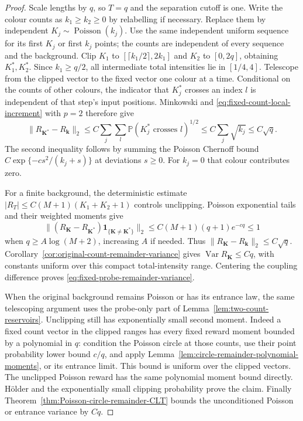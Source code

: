 \documentclass[11pt,letterpaper]{article}
\newcommand{\PP}{\mathbb P}\newcommand{\EE}{\mathbb E}
\newcommand{\ind}{\mathbf 1}\newcommand{\Exp}{\operatorname{Exp}}
\begin{document}
\begin{proof}
Scale lengths by $q$, so $T=q$ and the separation cutoff is
one. Write the colour counts as $k_1\ge k_2\ge0$ by
relabelling if necessary. Replace them by independent
$K_j\sim\operatorname{Poisson}(k_j)$. Use the same independent
uniform sequence for its first $K_j$ or first $k_j$ points;
the counts are independent of every sequence and the background.
Clip $K_1$ to $[\lceil k_1/2\rceil,2k_1]$ and $K_2$ to
$[0,2q]$, obtaining $K_1^*,K_2^*$. Since $k_1\ge q/2$,
all intermediate total intensities lie in $[1/4,4]$.
Telescope from the clipped vector to the fixed vector one
colour at a time. Conditional on the
counts of other colours, the indicator that $K_j^*$ crosses
an index $l$ is independent of that step's input positions.
Minkowski and \eqref{eq:fixed-count-local-increment} with $p=2$
therefore give
\[
 \|R_{\boldsymbol K^*}-R_{\boldsymbol k}\|_2
 \le C\sum_j\sum_l
    \PP(K_j^*\text{ crosses }l)^{1/2}
 \le C\sum_j\sqrt{k_j}\le C\sqrt q.
\]
The second inequality follows by summing the Poisson
Chernoff bound $C\exp\{-c s^2/(k_j+s)\}$ at deviations
$s\ge0$. For $k_j=0$ that colour contributes zero.

For a finite background, the deterministic estimate
$|R_T|\le C(M+1)(K_1+K_2+1)$ controls unclipping.
Poisson exponential tails and their weighted moments give
\[
 \|(R_{\boldsymbol K}-R_{\boldsymbol K^*})
                       \ind_{\{\boldsymbol K\ne\boldsymbol K^*\}}\|_2
       \le C(M+1)(q+1)e^{-cq}\le1
\]
when $q\ge A\log(M+2)$, increasing $A$ if needed.
Thus $\|R_{\boldsymbol K}-R_{\boldsymbol k}\|_2\le C\sqrt q$.
Corollary~\ref{cor:original-count-remainder-variance} gives
$\operatorname{Var}R_{\boldsymbol K}\le Cq$, with constants
uniform over this compact total-intensity range. Centering the
coupling difference proves \eqref{eq:fixed-probe-remainder-variance}.

When the original background remains Poisson or has its
entrance law, the same telescoping argument uses the
probe-only part of Lemma~\ref{lem:two-count-reservoirs}.
Unclipping still has exponentially small second moment.
Indeed a fixed count vector in the clipped ranges has every
fixed reward moment bounded by a polynomial in $q$: condition
the Poisson circle at those counts, use their point probability
lower bound $c/q$, and apply
Lemma~\ref{lem:circle-remainder-polynomial-moments}, or its
entrance limit. This bound is uniform over the clipped
vectors. The unclipped Poisson reward has the same polynomial
moment bound directly. H\"older and the exponentially small
clipping probability prove the claim. Finally
Theorem~\ref{thm:Poisson-circle-remainder-CLT} bounds the
unconditioned Poisson or entrance variance by $Cq$.
\end{proof}
\end{document}
